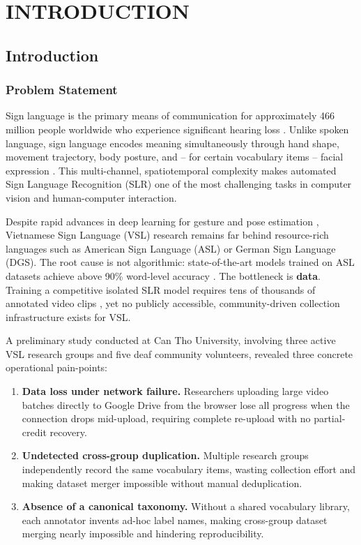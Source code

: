 \chapter{INTRODUCTION}

\section{Introduction}

\subsection{Problem Statement}
Sign language is the primary means of communication for approximately 466 million people worldwide who experience significant hearing loss \cite{who2021deafness}. Unlike spoken language, sign language encodes meaning simultaneously through hand shape, movement trajectory, body posture, and -- for certain vocabulary items -- facial expression \cite{ong2005automatic}. This multi-channel, spatiotemporal complexity makes automated Sign Language Recognition (SLR) one of the most challenging tasks in computer vision and human-computer interaction.

Despite rapid advances in deep learning for gesture and pose estimation \cite{koller2020weakly}, Vietnamese Sign Language (VSL) research remains far behind resource-rich languages such as American Sign Language (ASL) or German Sign Language (DGS). The root cause is not algorithmic: state-of-the-art models trained on ASL datasets achieve above 90\% word-level accuracy \cite{li2020wlasl}. The bottleneck is \textbf{data}. Training a competitive isolated SLR model requires tens of thousands of annotated video clips \cite{koller2020weakly}, yet no publicly accessible, community-driven collection infrastructure exists for VSL.

A preliminary study conducted at Can Tho University, involving three active VSL research groups and five deaf community volunteers, revealed three concrete operational pain-points:
\begin{enumerate}
    \item \textbf{Data loss under network failure.} Researchers uploading large video batches directly to Google Drive from the browser lose all progress when the connection drops mid-upload, requiring complete re-upload with no partial-credit recovery.
    \item \textbf{Undetected cross-group duplication.} Multiple research groups independently record the same vocabulary items, wasting collection effort and making dataset merger impossible without manual deduplication.
    \item \textbf{Absence of a canonical taxonomy.} Without a shared vocabulary library, each annotator invents ad-hoc label names, making cross-group dataset merging nearly impossible and hindering reproducibility.
\end{enumerate}

